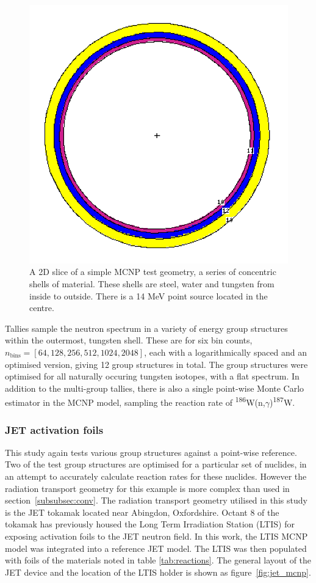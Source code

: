\begin{figure}[H]
  \centering
  \includegraphics[width=0.7\linewidth]{conv_mcnp}
  \caption{A 2D slice of a simple MCNP test geometry, a series of concentric shells of material. These shells are steel, water and tungsten from inside to outside. There is a 14 MeV point source located in the centre.}
  \label{fig:conv_mcnp}
\end{figure}

Tallies sample the neutron spectrum in a variety of energy group structures within the outermost, tungsten shell. These are for six bin counts, $n_\mathrm{bins} = [64,128,256,512,1024,2048]$, each with a logarithmically spaced and an optimised version, giving 12 group structures in total. The group structures were optimised for all naturally occuring tungsten isotopes, with a flat spectrum. In addition to the multi-group tallies, there is also a single point-wise Monte Carlo estimator in the MCNP model, sampling the reaction rate of \textsuperscript{186}W(n,$\gamma$)\textsuperscript{187}W.

\subsubsection{JET activation foils}
\label{subsubsec:jet}
This study again tests various group structures against a point-wise reference. Two of the test group structures are optimised for a particular set of nuclides, in an attempt to accurately calculate reaction rates for these nuclides. However the radiation transport geometry for this example is more complex than used in section~\ref{subsubsec:conv}. The radiation transport geometry utilised in this study is the JET tokamak located near Abingdon, Oxfordshire. Octant 8 of the tokamak has previously housed the Long Term Irradiation Station (LTIS) for exposing activation foils to the JET neutron field. In this work, the LTIS MCNP model \cite{lengar2017} was integrated into a reference JET model. The LTIS was then populated with foils of the materials noted in table \ref{tab:reactions}. The general layout of the JET device and the location of the LTIS holder is shown as figure~\ref{fig:jet_mcnp}.

